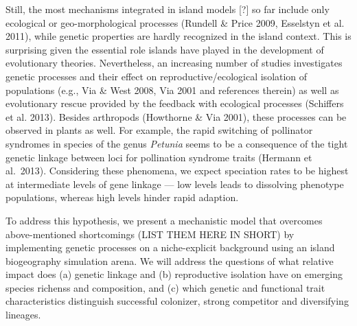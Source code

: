 \documentclass[a4paper]{scrartcl}
\begin{document}
Still, the most mechanisms integrated in island models [?] so far include only ecological or geo-morphological processes (Rundell \& Price 2009, Esselstyn et al. 2011),
while genetic properties are hardly recognized in the island context. This is surprising given the essential role islands have played in the development of evolutionary theories. Nevertheless, an increasing number of studies investigates genetic processes and
their effect on reproductive/ecological isolation of populations (e.g., Via \& West 2008, Via 2001 and references therein) as well as evolutionary rescue provided by the feedback with ecological processes (Schiffers et al. 2013).
Besides arthropods (Howthorne \& Via 2001), these processes can be observed in plants as well. %
For example, the rapid switching of pollinator syndromes in species of the genus \textit{Petunia} %
seems to be a consequence of the tight genetic linkage between loci for pollination syndrome traits (Hermann et al.\ 2013). %
Considering these phenomena, we expect speciation rates to be highest at intermediate levels of gene linkage --- low
levels leads to dissolving phenotype populations, whereas high levels hinder rapid adaption. %



To address this hypothesis, 
we present a mechanistic model that overcomes above-mentioned shortcomings (LIST THEM HERE IN SHORT)
by implementing genetic processes on a niche-explicit background
using an island biogeography simulation arena.%
We will address the questions of what relative impact does (a) genetic linkage and
(b) reproductive isolation have on emerging species richenss and composition,
and (c) which genetic and functional trait characteristics distinguish successful colonizer,
strong competitor and diversifying lineages.
\end{document}
